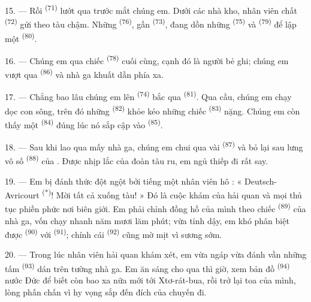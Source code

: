 
15. --- Rồi  \textsuperscript{(71)} lướt qua trước mắt chúng em.
Dưới các nhà kho, nhân viên chất  \textsuperscript{(72)} gửi theo tàu
chậm. Những  \textsuperscript{(76)}, gần 
\textsuperscript{(73)}, đang dồn những  \textsuperscript{(75)} và
 \textsuperscript{(79)} để lập một 
\textsuperscript{(80)}.

16. --- Chúng em qua chiếc  \textsuperscript{(78)} cuối cùng, cạnh đó là
người bẻ ghi; chúng em vượt qua  \textsuperscript{(86)} và nhà ga
khuất dần phía xa.

17. --- Chẳng bao lâu chúng em lên  \textsuperscript{(74)} bắc qua
 \textsuperscript{(81)}. Qua cầu, chúng em chạy dọc con sông, trên đó
những  \textsuperscript{(82)} khỏe kéo những chiếc 
\textsuperscript{(83)} nặng. Chúng em còn thấy một 
\textsuperscript{(84)} đúng lúc nó sắp cập vào  \textsuperscript{(85)}.

18. --- Sau khi lao qua mấy nhà ga, chúng em chui qua vài 
\textsuperscript{(87)} và bỏ lại sau lưng vô số  \textsuperscript{(88)}
của . Được nhịp lắc của đoàn tàu ru, em ngủ thiếp đi rất
say.

\VUsaut{3.0mm}
\VUsaut{3.0mm}

19. --- Em bị đánh thức đột ngột bởi tiếng một nhân viên hô : « Deutsch-Avricourt
\textsuperscript{(*)}! Mời tất cả xuống tàu! » Đó là cuộc khám của hải quan và mọi thủ
tục phiền phức nơi biên giới. Em phải chỉnh đồng hồ của mình theo chiếc  \textsuperscript{(89)} của nhà ga, vốn chạy nhanh năm mươi lăm phút; vừa tỉnh dậy,
em khó phân biệt được  \textsuperscript{(90)} với 
\textsuperscript{(91)}; chính cái  \textsuperscript{(92)} cũng mờ mịt
vì sương sớm.

20. --- Trong lúc nhân viên hải quan khám xét, em vừa ngáp vừa đánh vần những tấm
 \textsuperscript{(93)} dán trên tường nhà ga. Em ăn sáng cho qua thì
giờ, xem bản đồ  \textsuperscript{(94)} nước Đức để biết còn bao
xa nữa mới tới Xtơ-rát-bua, rồi trở lại toa của mình, lòng phấn chấn vì hy vọng sắp đến
đích của chuyến đi.
\VUsaut{6.0mm}
\VUfilet{22mm}
